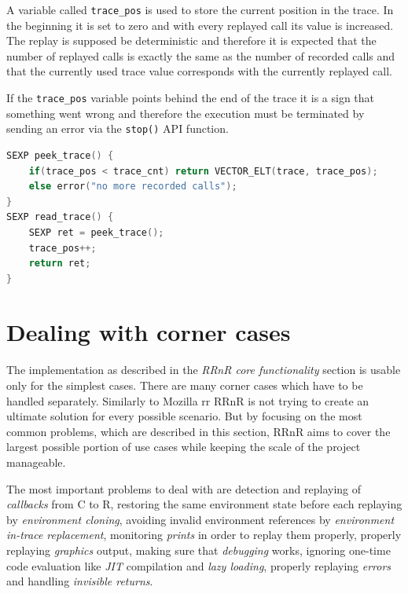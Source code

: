 \documentclass[thesis=M,english,hidelinks]{FITthesis}[2012/10/20]
\begin{document}
			A variable called \lstinline|trace_pos| is used to store the current position in the trace. In the beginning it is set to zero and with every replayed call its value is increased. The replay is supposed be deterministic and therefore it is expected that the number of replayed calls is exactly the same as the number of recorded calls and that the currently used trace value corresponds with the currently replayed call.\par
			
			If the \lstinline|trace_pos| variable points behind the end of the trace it is a sign that something went wrong and therefore the execution must be terminated by sending an error via the \lstinline|stop()| API function.\par
			
\begin{lstlisting}[style=filestyle, language=C, caption={Trace reading functions \lstinline|peek_trace()| and \lstinline|read_trace()|}]
SEXP peek_trace() {
	if(trace_pos < trace_cnt) return VECTOR_ELT(trace, trace_pos);
	else error("no more recorded calls");
}
SEXP read_trace() {
	SEXP ret = peek_trace();
	trace_pos++;
	return ret;
}
\end{lstlisting}
		
	\section{Dealing with corner cases}\label{dealing}
	The implementation as described in the \emph{RRnR core functionality} section is usable only for the simplest cases. There are many corner cases which have to be handled separately. Similarly to Mozilla rr RRnR is not trying to create an ultimate solution for every possible scenario. But by focusing on the most common problems, which are described in this section, RRnR aims to cover the largest possible portion of use cases while keeping the scale of the project manageable.\par
	
	The most important problems to deal with are detection and replaying of \emph{callbacks} from C to R, restoring the same environment state before each replaying by \emph{environment cloning}, avoiding invalid environment references by \emph{environment in-trace replacement}, monitoring \emph{prints} in order to replay them properly, properly replaying \emph{graphics} output, making sure that \emph{debugging} works, ignoring one-time code evaluation like \emph{JIT} compilation and \emph{lazy loading}, properly replaying \emph{errors} and handling \emph{invisible returns}.\par
	
\end{document}
